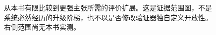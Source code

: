 \begin{figure}[htbp]
\centering

\caption{从本书有限比较到更强主张所需的评价扩展。这是证据范围图，不是系统必然经历的升级阶梯，也不以是否修改验证器独自定义开放性。右侧范围尚无本书实测。}
\label{fig:ch16-scope}
\end{figure}
